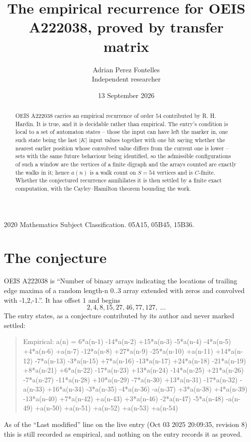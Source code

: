 \documentclass[11pt,a4paper]{article}
\title{The empirical recurrence for OEIS A222038, proved by transfer matrix}
\author{Adrian Perez Fontelles\\ \small Independent researcher}
\date{13 September 2026}
\theoremstyle{plain}
\theoremstyle{definition}
\begin{document}
\maketitle

\begin{abstract}
OEIS A222038 carries an empirical recurrence of order $54$ contributed by R. H. Hardin. It is
true, and it is decidable rather than empirical. The entry's condition is local to a set of automaton states -- those the input can have left the marker in, one such state being the last $|K|$ input values together with one bit saying whether the nearest earlier position whose convolved value differs from the current one is lower -- sets with the same future behaviour being identified, so
the admissible configurations of such a window are the vertices of a finite digraph and the
arrays counted are exactly the walks in it; hence $a(n)$ is a walk count on $S=54$ vertices
and is $C$-finite. Whether the conjectured recurrence annihilates it is then settled by a
finite exact computation, with the Cayley--Hamilton theorem bounding the work.
\end{abstract}

\noindent\small 2020 Mathematics Subject Classification. 05A15, 05B45, 15B36.\normalsize

\section{The conjecture}

OEIS A222038 is ``Number of binary arrays indicating the locations of trailing edge maxima of a random length-n 0..3 array extended with zeros and convolved with -1,2,-1.''. It has offset $1$ and begins
\[
2, 4, 8, 15, 27, 46, 77, 127,\ \dots
\]
The entry states, as a conjecture contributed by its author and never marked settled:
\begin{quote}
Empirical: a(n) = 6*a(n-1) -14*a(n-2) +15*a(n-3) -5*a(n-4) -4*a(n-5) +4*a(n-6) +a(n-7) -12*a(n-8) +27*a(n-9) -25*a(n-10) +a(n-11) +14*a(n-12) -7*a(n-13) -3*a(n-15) +7*a(n-16) -13*a(n-17) +24*a(n-18) -21*a(n-19) +8*a(n-21) +6*a(n-22) -17*a(n-23) +13*a(n-24) -14*a(n-25) +21*a(n-26) -7*a(n-27) -11*a(n-28) +10*a(n-29) -7*a(n-30) +13*a(n-31) -17*a(n-32) -a(n-33) +16*a(n-34) -3*a(n-35) -4*a(n-36) -a(n-37) +3*a(n-38) +4*a(n-39) -13*a(n-40) +7*a(n-42) +a(n-43) +3*a(n-46) -2*a(n-47) -5*a(n-48) -a(n-49) +a(n-50) +a(n-51) +a(n-52) +a(n-53) +a(n-54)
\end{quote}
As of the ``Last modified'' line on the live entry (Oct 03 2025 20:09:35, revision 8) this is still
recorded as empirical, and nothing on the entry records it as proved.
\end{document}

